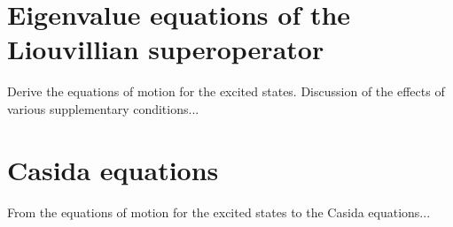 \documentclass[reprint,aps,prb]{revtex4-1}
\begin{document}
\appendix
\section{Eigenvalue equations of the Liouvillian superoperator}

Derive the equations of motion for the excited states. Discussion of the effects of various supplementary conditions...

\section{Casida equations}

From the equations of motion for the excited states to the Casida equations...



%

\end{document}
